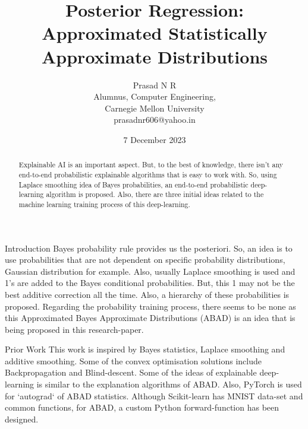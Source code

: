 \documentclass{article}
\title{Posterior Regression: Approximated Statistically Approximate Distributions}
\author{Prasad N R\\Alumnus, Computer Engineering, \\Carnegie Mellon University\\prasadnr606@yahoo.in}
\date{7 December 2023}
\begin{document}
	\maketitle 
	\begin{abstract}
		Explainable AI is an important aspect. But, to the best of knowledge, there isn't any end-to-end probabilistic explainable algorithms that is easy to work with. So, using Laplace smoothing idea of Bayes probabilities, an end-to-end probabilistic deep-learning algorithm is proposed. Also, there are three initial ideas related to the machine learning training process of this deep-learning.
	\end{abstract}
	
	\begin{section}{Introduction}
		Bayes probability rule provides us the posteriori. So, an idea is to use probabilities that are not dependent on specific probability distributions, Gaussian distribution for example. Also, usually Laplace smoothing is used and 1's are added to the Bayes conditional probabilities. But, this 1 may not be the best additive correction all the time. Also, a hierarchy of these probabilities is proposed. Regarding the probability training process, there seems to be none as this Approximated Bayes Approximate Distributions (ABAD) is an idea that is being proposed in this research-paper. 
	\end{section}
	
	\begin{section}{Prior Work}
		This work is inspired by Bayes statistics, Laplace smoothing and additive smoothing. Some of the convex optimisation solutions include Backpropagation and Blind-descent.\cite{hinton}\cite{blindDescent} Some of the ideas of explainable deep-learning is similar to the explanation algorithms of ABAD.\cite{explainableDeepLearning} Also, PyTorch is used for `autograd` of ABAD statistics.\cite{PyTorch} Although Scikit-learn has MNIST data-set and common functions, for ABAD, a custom Python forward-function has been designed.\cite{scikit-learn}
	\end{section}
	
\end{document}
